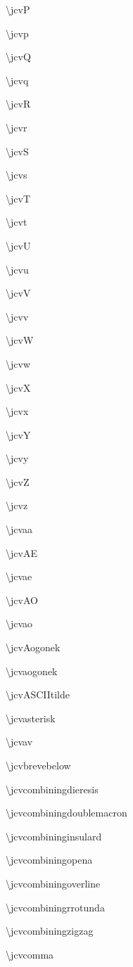 \documentclass{article}
\begin{document}
\begin{multicols}{3}
\textbackslash jcvP

\textbackslash jcvp

\textbackslash jcvQ

\textbackslash jcvq

\textbackslash jcvR

\textbackslash jcvr

\textbackslash jcvS

\textbackslash jcvs

\textbackslash jcvT

\textbackslash jcvt

\textbackslash jcvU

\textbackslash jcvu

\textbackslash jcvV

\textbackslash jcvv

\textbackslash jcvW

\textbackslash jcvw

\textbackslash jcvX

\textbackslash jcvx

\textbackslash jcvY

\textbackslash jcvy

\textbackslash jcvZ

\textbackslash jcvz

\textbackslash jcvaa

\textbackslash jcvAE

\textbackslash jcvae

\textbackslash jcvAO

\textbackslash jcvao

\textbackslash jcvAogonek

\textbackslash jcvaogonek

\textbackslash jcvASCIItilde

\textbackslash jcvasterisk

\textbackslash jcvav

\textbackslash jcvbrevebelow

\textbackslash jcvcombiningdieresis

\textbackslash jcvcombiningdoublemacron

\textbackslash jcvcombininginsulard

\textbackslash jcvcombiningopena

\textbackslash jcvcombiningoverline

\textbackslash jcvcombiningrrotunda

\textbackslash jcvcombiningzigzag

\textbackslash jcvcomma


\end{multicols}
\end{document}
